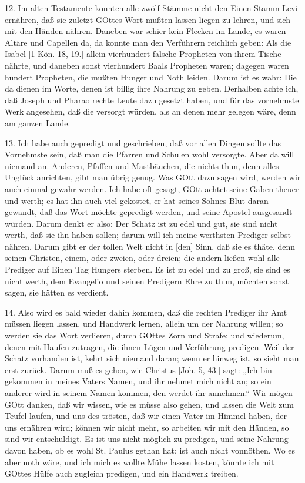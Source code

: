 12. Im alten Testamente konnten alle zwölf Stämme nicht den Einen Stamm Levi ernähren, daß sie zuletzt GOttes Wort mußten lassen liegen zu lehren, und sich mit den Händen nähren. Daneben war schier kein Flecken im Lande, es waren Altäre und Capellen da, da konnte man den Verführern reichlich geben: Als die Isabel [1 Kön. 18, 19.] allein vierhundert falsche Propheten von ihrem Tische nährte, und daneben sonst vierhundert Baals Propheten waren; dagegen waren hundert Propheten, die mußten Hunger und Noth leiden. Darum ist es wahr: Die da dienen im Worte, denen ist billig ihre Nahrung zu geben. Derhalben achte ich, daß Joseph und Pharao rechte Leute dazu gesetzt haben, und für das vornehmste Werk angesehen, daß die versorgt würden, als an denen mehr gelegen wäre, denn am ganzen Lande.

13. Ich habe auch gepredigt und geschrieben, daß vor allen Dingen sollte das Vornehmste sein, daß man die Pfarren und Schulen wohl versorgte. Aber da will niemand an. Anderen, Pfaffen und Mastbäuchen, die nichts thun, denn alles Unglück anrichten, gibt man übrig genug. Was GOtt dazu sagen wird, werden wir auch einmal gewahr werden. Ich habe oft gesagt, GOtt achtet seine Gaben theuer und werth; es hat ihn auch viel gekostet, er hat seines Sohnes Blut daran gewandt, daß das Wort möchte gepredigt werden, und seine Apostel ausgesandt würden. Darum denkt er also: Der Schatz ist zu edel und gut, sie sind nicht werth, daß sie ihn haben sollen; darum will ich meine werthsten Prediger selbst nähren. Darum gibt er der tollen Welt nicht in [den] Sinn, daß sie es thäte, denn seinen Christen, einem, oder zweien, oder dreien; die andern ließen wohl alle Prediger auf Einen Tag Hungers sterben. Es ist zu edel und zu groß, sie sind es nicht werth, dem Evangelio und seinen Predigern Ehre zu thun, möchten sonst sagen, sie hätten es verdient.

14. Also wird es bald wieder dahin kommen, daß die rechten Prediger ihr Amt müssen liegen lassen, und Handwerk lernen, allein um der Nahrung willen; so werden sie das Wort verlieren, durch GOttes Zorn und Strafe; und wiederum, denen mit Haufen zutragen, die ihnen Lügen und Verführung predigen. Weil der Schatz vorhanden ist, kehrt sich niemand daran; wenn er hinweg ist, so sieht man erst zurück. Darum muß es gehen, wie Christus [Joh. 5, 43.] sagt: „Ich bin gekommen in meines Vaters Namen, und ihr nehmet mich nicht an; so ein anderer wird in seinem Namen kommen, den werdet ihr annehmen.“ Wir mögen GOtt danken, daß wir wissen, wie es müsse also gehen, und lassen die Welt zum Teufel laufen, und uns des trösten, daß wir einen Vater im Himmel haben, der uns ernähren wird; können wir nicht mehr, so arbeiten wir mit den Händen, so sind wir entschuldigt. Es ist uns nicht möglich
zu predigen, und seine Nahrung davon haben, ob es wohl St. Paulus gethan hat; ist auch nicht vonnöthen. Wo es aber noth wäre, und ich mich es wollte Mühe lassen kosten, könnte ich mit GOttes Hülfe auch zugleich predigen, und ein Handwerk treiben.

